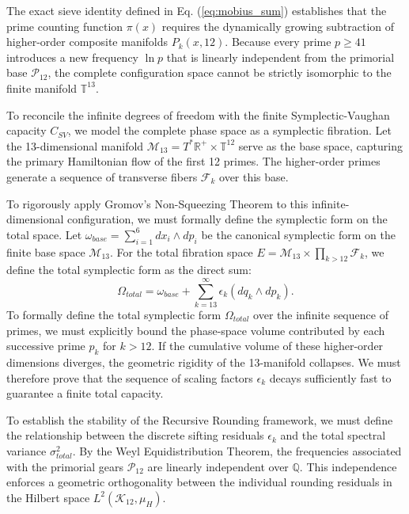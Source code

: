 \documentclass[sn-mathphys-num, pdflatex]{sn-jnl}
\begin{document}
The exact sieve identity defined in Eq. (\ref{eq:mobius_sum}) establishes that the prime counting function $\pi(x)$ requires the dynamically growing subtraction of higher-order composite manifolds $P_k(x,12)$. Because every prime $p \ge 41$ introduces a new frequency $\ln p$ that is linearly independent from the primorial base $\mathcal{P}_{12}$, the complete configuration space cannot be strictly isomorphic to the finite manifold $\mathbb{T}^{13}$. 

To reconcile the infinite degrees of freedom with the finite Symplectic-Vaughan capacity $C_{SV}$, we model the complete phase space as a symplectic fibration. Let the 13-dimensional manifold $\mathcal{M}_{13} = T^*\mathbb{R}^+ \times \mathbb{T}^{12}$ serve as the base space, capturing the primary Hamiltonian flow of the first 12 primes. The higher-order primes generate a sequence of transverse fibers $\mathcal{F}_k$ over this base.

To rigorously apply Gromov's Non-Squeezing Theorem to this infinite-dimensional configuration, we must formally define the symplectic form on the total space. Let $\omega_{base} = \sum_{i=1}^{6} dx_i \wedge dp_i$ be the canonical symplectic form on the finite base space $\mathcal{M}_{13}$. For the total fibration space $E = \mathcal{M}_{13} \times \prod_{k>12} \mathcal{F}_k$, we define the total symplectic form as the direct sum:
\begin{equation}
\Omega_{total} = \omega_{base} + \sum_{k=13}^{\infty} \epsilon_k (dq_k \wedge dp_k).
\end{equation}
To formally define the total symplectic form $\Omega_{total}$ over the infinite sequence of primes, we must explicitly bound the phase-space volume contributed by each successive prime $p_k$ for $k > 12$. If the cumulative volume of these higher-order dimensions diverges, the geometric rigidity of the 13-manifold collapses. We must therefore prove that the sequence of scaling factors $\epsilon_k$ decays sufficiently fast to guarantee a finite total capacity.

To establish the stability of the Recursive Rounding framework, we must define the relationship between the discrete sifting residuals $\epsilon_k$ and the total spectral variance $\sigma_{total}^2$. By the Weyl Equidistribution Theorem, the frequencies associated with the primorial gears $\mathcal{P}_{12}$ are linearly independent over $\mathbb{Q}$. This independence enforces a geometric orthogonality between the individual rounding residuals in the Hilbert space $L^2(\mathcal{K}_{12}, \mu_H)$.
\end{document}
